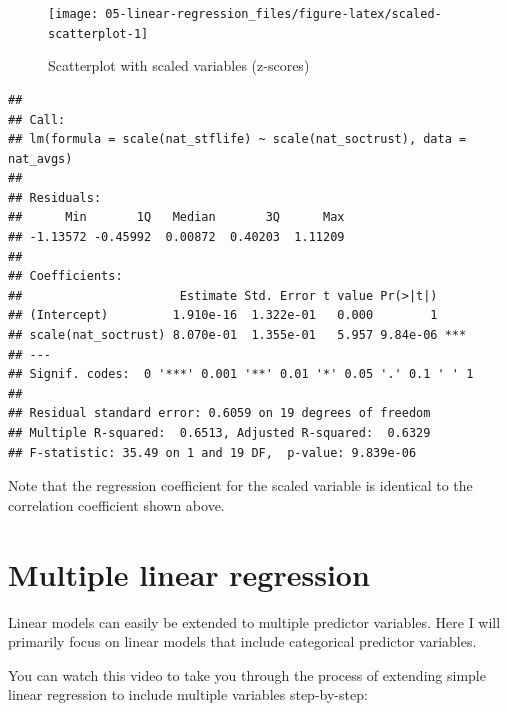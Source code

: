 \documentclass[
]{book}
\newenvironment{Shaded}{\begin{snugshade}}{\end{snugshade}}
\newcommand{\DataTypeTok}[1]{\textcolor[rgb]{0.13,0.29,0.53}{#1}}
\newcommand{\KeywordTok}[1]{\textcolor[rgb]{0.13,0.29,0.53}{\textbf{#1}}}
\newcommand{\NormalTok}[1]{#1}
\newcommand{\OperatorTok}[1]{\textcolor[rgb]{0.81,0.36,0.00}{\textbf{#1}}}
\newcommand{\StringTok}[1]{\textcolor[rgb]{0.31,0.60,0.02}{#1}}
\begin{document}
\begin{figure}

{\centering \texttt{[image: 05-linear-regression\_files/figure-latex/scaled-scatterplot-1]} 

}

\caption{Scatterplot with scaled variables (z-scores)}\label{fig:scaled-scatterplot}
\end{figure}

\begin{Shaded}
\end{Shaded}

\begin{verbatim}
## 
## Call:
## lm(formula = scale(nat_stflife) ~ scale(nat_soctrust), data = nat_avgs)
## 
## Residuals:
##      Min       1Q   Median       3Q      Max 
## -1.13572 -0.45992  0.00872  0.40203  1.11209 
## 
## Coefficients:
##                      Estimate Std. Error t value Pr(>|t|)    
## (Intercept)         1.910e-16  1.322e-01   0.000        1    
## scale(nat_soctrust) 8.070e-01  1.355e-01   5.957 9.84e-06 ***
## ---
## Signif. codes:  0 '***' 0.001 '**' 0.01 '*' 0.05 '.' 0.1 ' ' 1
## 
## Residual standard error: 0.6059 on 19 degrees of freedom
## Multiple R-squared:  0.6513,	Adjusted R-squared:  0.6329 
## F-statistic: 35.49 on 1 and 19 DF,  p-value: 9.839e-06
\end{verbatim}

Note that the regression coefficient for the scaled variable is
identical to the correlation coefficient shown above.

\hypertarget{multiple-linear-regression}{%
\section{Multiple linear regression}\label{multiple-linear-regression}}

Linear models can easily be extended to multiple predictor variables.
Here I will primarily focus on linear models that include categorical
predictor variables.

You can watch this video to take you through the process of extending
simple linear regression to include multiple variables step-by-step:
\end{document}
